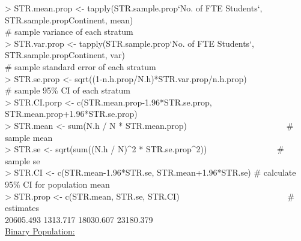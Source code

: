 \documentclass{article}
\begin{document}
\textgreater\hspace{1mm} STR.mean.prop \textless- tapply(STR.sample.prop\textdollar `No. of FTE Students`, STR.sample.prop\textdollar Continent, mean)\\
\hspace{1mm} \# sample variance of each stratum\\
\textgreater\hspace{1mm} STR.var.prop \textless- tapply(STR.sample.prop\textdollar `No. of FTE Students`, STR.sample.prop\textdollar Continent, var)\\
\hspace{1mm} \# sample standard error of each stratum\\
\textgreater\hspace{1mm} STR.se.prop \textless- sqrt((1-n.h.prop/N.h)*STR.var.prop/n.h.prop)\\
\hspace{1mm} \# sample 95\% CI of each stratum\\
\textgreater\hspace{1mm} STR.CI.porp \textless- c(STR.mean.prop-1.96*STR.se.prop, STR.mean.prop+1.96*STR.se.prop)\\
\textgreater\hspace{1mm} STR.mean \textless- sum(N.h / N * STR.mean.prop) ~~~~~~~~~~~~~~~~~~~~~~~\# sample mean\\
\textgreater\hspace{1mm} STR.se \textless- sqrt(sum((N.h / N)\textasciicircum 2 * STR.se.prop\textasciicircum 2)) ~~~~~~~~~~~~~~~~\# sample se\\
\textgreater\hspace{1mm} STR.CI \textless- c(STR.mean-1.96*STR.se, STR.mean+1.96*STR.se) \# calculate 95\% CI for population mean\\
\textgreater\hspace{1mm} STR.prop \textless- c(STR.mean, STR.se, STR.CI) ~~~~~~~~~~~~~~~~~~~~~~~~~\# estimates\\
\hspace{1mm} 20605.493 1313.717 18030.607 23180.379\\
\noindent\underline{Binary Population:}
\end{document}

